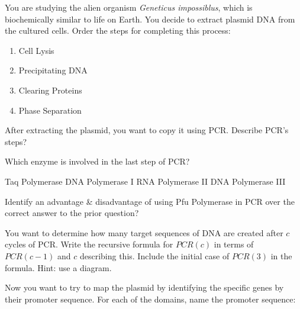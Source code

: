 \documentclass[addpoints]{exam}
\begin{document}
\begin{questions}

\bracketedpoints

\printanswers


\question[4] You are studying the alien organism \textit{Geneticus impossiblus}, which is biochemically similar to life on Earth. You decide to extract plasmid DNA from the cultured cells. Order the steps for completing this process: \fillin[I, IV, III, II][0pt]

\renewcommand{\labelenumi}{\Roman{enumi}}
\begin{enumerate}
    \item Cell Lysis
    \item Precipitating DNA
    \item Clearing Proteins
    \item Phase Separation
\end{enumerate}

\question[3] After extracting the plasmid, you want to copy it using PCR. Describe PCR’s steps?


\question[1] Which enzyme is involved in the last step of PCR?

\begin{choices}
    \CorrectChoice Taq Polymerase
    \choice DNA Polymerase I
    \choice RNA Polymerase II
    \choice DNA Polymerase III
\end{choices}

\question[3] Identify an advantage \& disadvantage of using Pfu Polymerase in PCR over the correct answer to the prior question? 

\question[12] You want to determine how many target sequences of DNA are created after $c$ cycles of PCR. Write the recursive formula for $PCR(c)$ in terms of $PCR(c-1)$ and $c$ describing this. Include the initial case of $PCR (3)$ in the formula. Hint: use a diagram. 

\fullwidth{\fillin[$PCR(c)=2*(PCR(c-1)+(c-2)); PCR (3)=2$][\textwidth]}

\question Now you want to try to map the plasmid by identifying the specific genes by their promoter sequence. For each of the domains, name the promoter sequence:


\end{questions}
\end{document}
